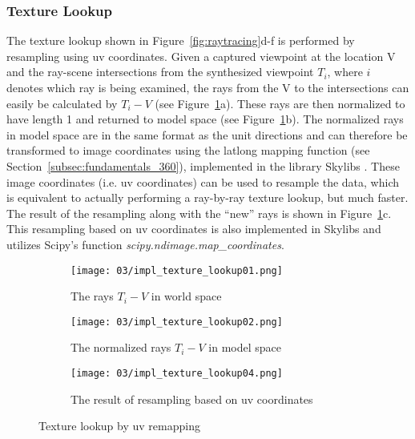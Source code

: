 \subsubsection{Texture Lookup}
The texture lookup shown in Figure~\ref{fig:raytracing}d-f is performed by resampling using uv coordinates. Given a captured viewpoint at the location V and the ray-scene intersections from the synthesized viewpoint $T_i$, where $i$ denotes which ray is being examined, the rays from the V to the intersections can easily be calculated by $T_i-V$ (see Figure~\ref{fig:impl_texture_lookup}a). These rays are then normalized to have length 1 and returned to model space (see Figure~\ref{fig:impl_texture_lookup}b). The normalized rays in model space are in the same format as the unit directions and can therefore be transformed to image coordinates using the latlong mapping function (see Section~\ref{subsec:fundamentals_360}), implemented in the library Skylibs \cite{skylibs}. These image coordinates (i.e. uv coordinates) can be used to resample the data, which is equivalent to actually performing a ray-by-ray texture lookup, but much faster. The result of the resampling along with the ``new'' rays is shown in Figure~\ref{fig:impl_texture_lookup}c. This resampling based on uv coordinates is also implemented in Skylibs and utilizes Scipy's function \emph{scipy.ndimage.map\_coordinates}.

\begin{figure}
\centering
    \hfill
    \begin{subfigure}[t]{0.3\textwidth}
            \centering
            \texttt{[image: 03/impl\_texture\_lookup01.png]}
            \caption{The rays $T_i-V$ in world space}
    \end{subfigure}%
    \hfill
    \begin{subfigure}[t]{0.3\textwidth}
            \centering
            \texttt{[image: 03/impl\_texture\_lookup02.png]}
            \caption{The normalized rays $T_i-V$ in model space}
    \end{subfigure}
    \hfill
    \begin{subfigure}[t]{0.3\textwidth}
            \centering
            \texttt{[image: 03/impl\_texture\_lookup04.png]}
            \caption{The result of resampling based on uv coordinates}
    \end{subfigure}%
    \hfill
  \caption{Texture lookup by uv remapping} \label{fig:impl_texture_lookup}
\end{figure}

